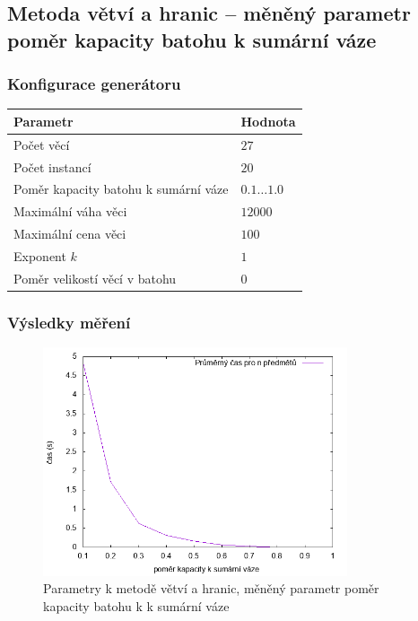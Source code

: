 \documentclass{article}
\begin{document}
\subsection{Metoda větví a hranic -- měněný parametr poměr kapacity batohu k sumární váze}

\subsubsection*{Konfigurace generátoru}

\begin{table}[H]
\centering
    \begin{tabular}{ |l|l| } 
        \hline
        Parametr & Hodnota \\
        \hline
        \hline
        Počet věcí & $27$ \\
        Počet instancí & $20$ \\
        Poměr kapacity batohu k sumární váze & $0.1 \dots 1.0$ \\
        Maximální váha věci & $12000$ \\
        Maximální cena věci & $100$ \\
        Exponent $k$ & $1$ \\
        Poměr velikostí věcí v batohu & $0$ \\
        \hline
    \end{tabular}
\end{table}

\subsubsection*{Výsledky měření}

\begin{figure}[H]
    \centering
    \includegraphics[width=0.8\textwidth]{inputs-bb-ratio/inputs-bb-ratio.png}
    \caption{Parametry k metodě větví a hranic, měněný parametr poměr kapacity batohu k k sumární váze}
    \label{fig:g2}
\end{figure}
\end{document}
